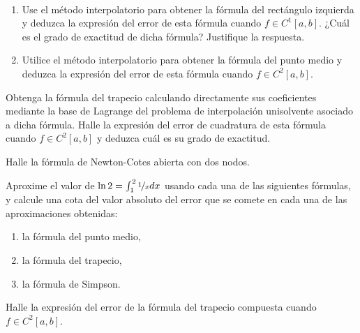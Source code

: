 \begin{ejercicio}\label{ej:2.1.11}~
    \begin{enumerate}
        \item Use el método interpolatorio para obtener la fórmula del rectángulo izquierda y deduzca la expresión del error de esta fórmula cuando $f \in C^1[a, b]$. ¿Cuál es el grado de exactitud de dicha fórmula? Justifique la respuesta.
        \item Utilice el método interpolatorio para obtener la fórmula del punto medio y deduzca la expresión del error de esta fórmula cuando $f \in C^2[a, b]$.
    \end{enumerate}
\end{ejercicio}

\begin{ejercicio}\label{ej:2.1.12}
    Obtenga la fórmula del trapecio calculando directamente sus coeficientes mediante la base de Lagrange del problema de interpolación unisolvente asociado a dicha fórmula. Halle la expresión del error de cuadratura de esta fórmula cuando $f \in C^2[a, b]$ y deduzca cuál es su grado de exactitud.
\end{ejercicio}

\begin{ejercicio}\label{ej:2.1.13}
    Halle la fórmula de Newton-Cotes abierta con dos nodos.
\end{ejercicio}

\begin{ejercicio}\label{ej:2.1.14}
    Aproxime el valor de $\ln 2 = \int_{1}^{2} \nicefrac{1}{x} dx$ usando cada una de las siguientes fórmulas, y calcule una cota del valor absoluto del error que se comete en cada una de las aproximaciones obtenidas:
    \begin{enumerate}
        \item la fórmula del punto medio,
        \item la fórmula del trapecio,
        \item la fórmula de Simpson.
    \end{enumerate}
\end{ejercicio}

\begin{ejercicio}\label{ej:2.1.15}
    Halle la expresión del error de la fórmula del trapecio compuesta cuando $f \in C^2[a, b]$.
\end{ejercicio}

